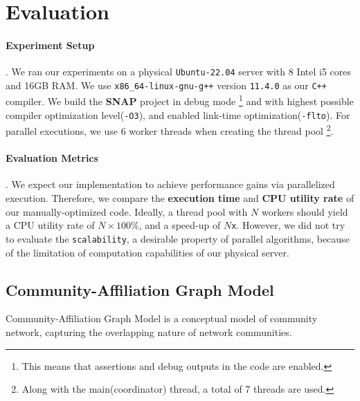 \section{Evaluation}\label{sec:evaluation}

\paragraph{Experiment Setup}. We ran our experiments on a physical
\texttt{Ubuntu-22.04} server with 8 Intel i5 cores and 16GB RAM. We use 
\texttt{x86\_64-linux-gnu-g++} version \texttt{11.4.0} as our \texttt{C++} compiler.
We build the \textbf{SNAP} project in debug mode
\footnote{This means that assertions and debug outputs in the code are enabled.}
and with highest possible compiler optimization  level(\texttt{-O3}), and 
enabled link-time optimization(\texttt{-flto}).
For parallel executions, we use $6$ worker threads when creating the thread
pool
\footnote{Along with the main(coordinator) thread, a total of 7 threads 
are used.}.

\paragraph{Evaluation Metrics}. We expect our implementation to achieve 
performance gains via parallelized execution. Therefore, we compare the 
\textbf{execution time} and \textbf{CPU utility rate} of our 
manually-optimized code. Ideally, a thread pool with $N$ workers should yield
a CPU utility rate of $N\times 100\%$, and a speed-up of $N$\texttt{x}. However,
we did not try to evaluate the \texttt{scalability}, a desirable property of 
parallel algorithms, because of the limitation of computation capabilities of
 our physical server.

\subsection{Community-Affiliation Graph Model}

\par Community-Affiliation Graph Model\citep{yang2012structure,yang2012community} 
is a conceptual model of community network, capturing the overlapping nature of 
network communities.


